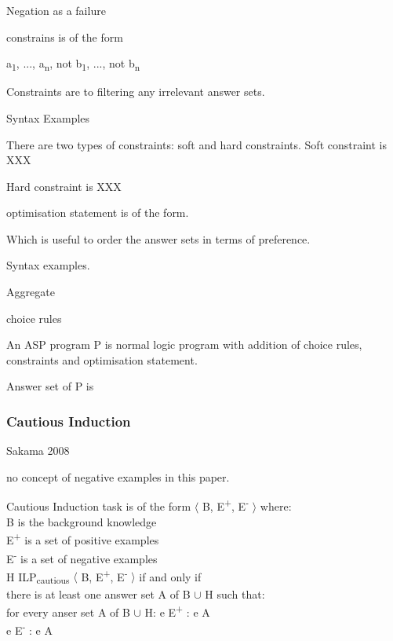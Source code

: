 \documentclass[12pt,twoside]{report}
\begin{document}
Negation as a failure

constrains is of the form
\begin{theorem}
\leftarrow a\textsubscript{1}, ..., a\textsubscript{n}, not b\textsubscript{1}, ..., not b\textsubscript{n}
\end{theorem}

Constraints are to filtering any irrelevant answer sets.

Syntax Examples

There are two types of constraints: soft and hard constraints. Soft constraint is XXX

Hard constraint is XXX

optimisation statement is of the form.

Which is useful to order the answer sets in terms of preference.

Syntax examples.

Aggregate

choice rules

An ASP program P is normal logic program with addition of choice rules, constraints and optimisation statement.

Answer set of P is


\subsubsection{Cautious Induction}

Sakama 2008

no concept of negative examples in this paper.

Cautious Induction task is of the form $\langle$ B, E\textsuperscript{+}, E\textsuperscript{-} $\rangle$ where: \\
B is the background knowledge \\
E\textsuperscript{+} is a set of positive examples \\
E\textsuperscript{-} is a set of negative examples \\

 H \in ILP\textsubscript{cautious} $\langle$ B, E\textsuperscript{+}, E\textsuperscript{-} $\rangle$ if and only if  \\

 there is at least one answer set A of B $\cup$ H such that: \\
 for every anser set A of B $\cup$ H:
\forall e \in E\textsuperscript{+} : e \in A \\
\forall e \in E\textsuperscript{-} : e \notin A \\
\end{document}
